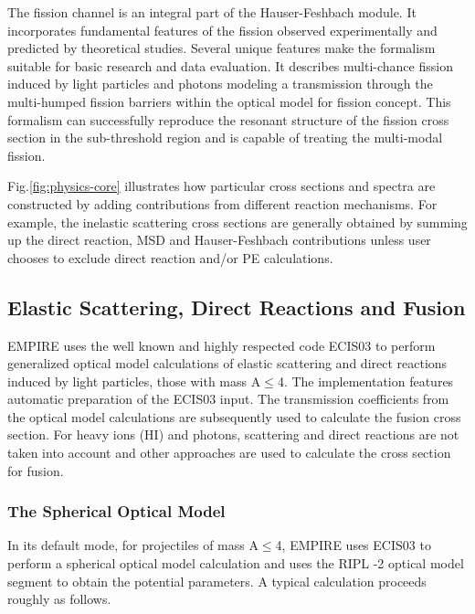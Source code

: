 The fission channel is an integral part of the Hauser-Feshbach module. It
incorporates fundamental features of the fission observed experimentally and
predicted by theoretical studies. Several unique features make the formalism
suitable for basic research and data evaluation. It describes multi-chance
fission induced by light particles and photons modeling a transmission
through the multi-humped fission barriers within the optical model for
fission concept. This formalism can successfully reproduce the resonant
structure of the fission cross section in the sub-threshold region and is
capable of treating the multi-modal fission.

Fig.\ref{fig:physics-core} illustrates how particular cross sections and
spectra are constructed by adding contributions from different reaction
mechanisms. For example, the inelastic scattering cross sections are
generally obtained by summing up the direct reaction, MSD and
Hauser-Feshbach contributions unless user chooses to exclude direct reaction
and/or PE calculations.


\subsection{Elastic Scattering, Direct Reactions and Fusion}

EMPIRE uses the well known and highly respected code ECIS03 \cite{ECIS} to
perform generalized optical model calculations of elastic scattering and
direct reactions induced by light particles, those with mass A$\leq$4. The
implementation features automatic preparation of the ECIS03 input. The
transmission coefficients from the optical model calculations are
subsequently used to calculate the fusion cross section. For heavy ions (HI)
and photons, scattering and direct reactions are not taken into account and
other approaches are used to calculate the cross section for fusion.

\subsubsection{The Spherical Optical Model\label{sec:sph-opt}}

In its default mode, for projectiles of mass A$\leq$4, EMPIRE uses ECIS03 to
perform a spherical optical model calculation and uses the RIPL%
-2 \cite{RIPL2} optical model segment to obtain the potential
parameters. A typical calculation proceeds roughly as follows.

